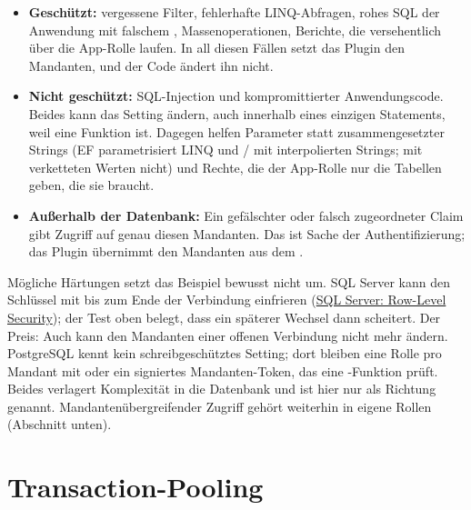 \begin{itemize}
  \item \textbf{Geschützt:} vergessene Filter, fehlerhafte LINQ-Abfragen, rohes SQL der
    Anwendung mit falschem , Massenoperationen, Berichte, die versehentlich über
    die App-Rolle laufen. In all diesen Fällen setzt das Plugin den Mandanten, und der Code
    ändert ihn nicht.
  \item \textbf{Nicht geschützt:} SQL-Injection und kompromittierter Anwendungscode. Beides
    kann das Setting ändern, auch innerhalb eines einzigen Statements, weil
     eine Funktion ist. Dagegen helfen Parameter statt
    zusammengesetzter Strings (EF parametrisiert LINQ und
    / mit interpolierten Strings;
     mit verketteten Werten nicht) und Rechte, die
    der App-Rolle nur die Tabellen geben, die sie braucht.
  \item \textbf{Außerhalb der Datenbank:} Ein gefälschter oder falsch zugeordneter Claim gibt
    Zugriff auf genau diesen Mandanten. Das ist Sache der Authentifizierung; das Plugin
    übernimmt den Mandanten aus dem .
\end{itemize}

Mögliche Härtungen setzt das Beispiel bewusst nicht um. SQL Server kann den Schlüssel mit
 bis zum Ende der Verbindung
einfrieren
(\href{https://learn.microsoft.com/en-us/sql/relational-databases/security/row-level-security}{SQL Server: Row-Level Security});
der Test oben belegt, dass ein späterer Wechsel dann scheitert. Der Preis: Auch
 kann den Mandanten einer offenen Verbindung
nicht mehr ändern. PostgreSQL kennt kein schreibgeschütztes Setting; dort bleiben eine Rolle pro
Mandant mit  oder ein signiertes Mandanten-Token, das eine
-Funktion prüft. Beides verlagert Komplexität in die Datenbank und ist
hier nur als Richtung genannt. Mandantenübergreifender Zugriff gehört weiterhin in eigene
Rollen (Abschnitt unten).

\section{Transaction-Pooling}\label{sec:transaction-pooling}


